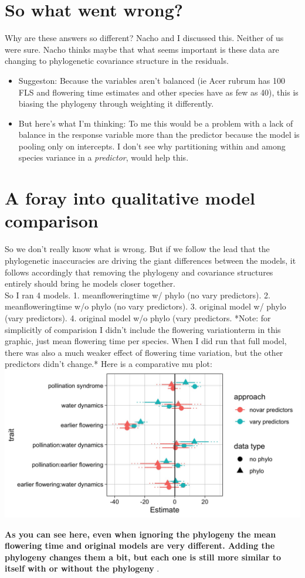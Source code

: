 \documentclass{article}\usepackage[]{graphicx}\usepackage[]{color}
\begin{document}
\section{So what went wrong?}
Why are these answers so different? Nacho and I discussed this. Neither of us were sure. Nacho thinks maybe that what seems important is these data are changing to phylogenetic covariance structure in the residuals.
\begin{itemize}
\item Suggeston: Because the variables aren't balanced (ie Acer rubrum has 100 FLS and flowering time estimates and other species have as few as 40), this is biasing the phylogeny through weighting it differently.
\item But here's what I'm thinking: To me this would be a problem with a lack of balance in the response variable more than the predictor because the model is pooling only on intercepts. I don't see why partitioning within and among species variance in a \emph{predictor}, would help this.
\end{itemize}

\section{A foray into qualitative model comparison}
So we don't really know what is wrong. But if we follow the lead that the phylogenetic inaccuracies are driving the giant differences between the models, it follows accordingly that removing the phylogeny and covariance structures entirely should bring he models closer together.\\

So I ran 4 models. 1. meanfloweringtime w/ phylo (no vary predictors). 2. meanfloweringtime w/o phylo (no vary predictors). 3. original model w/ phylo (vary predictors). 4. original model w/o phylo (vary predictors. *Note: for simplicitly of comparision I didn't include the flowering variationterm in this graphic, just mean flowering time per species. When I did run that full model, there was also a much weaker effect of flowering time variation, but the other predictors didn't change.* Here is a comparative mu plot:\\

 \includegraphics[width=\textwidth]{Uhoh_best.jpeg} 
    \caption{\textbf{As you can see here, even when ignoring the phylogeny the mean flowering time and original models are very different. Adding the phylogeny changes them a bit, but each one is still more similar to itself with or without the phylogeny }.}
\end{document}
